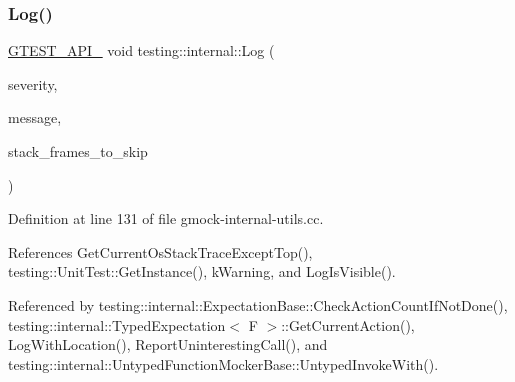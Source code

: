 \subsubsection{\texorpdfstring{Log()}{Log()}}
{\footnotesize\ttfamily \hyperlink{gtest-port_8h_aa73be6f0ba4a7456180a94904ce17790}{G\+T\+E\+S\+T\+\_\+\+A\+P\+I\+\_\+} void testing\+::internal\+::\+Log (\begin{DoxyParamCaption}\item[{\hyperlink{namespacetesting_1_1internal_a203d1a8a2147a53d12bbdae40d443914}{Log\+Severity}}]{severity,  }\item[{const \hyperlink{namespacetesting_1_1internal_a8e8ff5b11e64078831112677156cb111}{string} \&}]{message,  }\item[{int}]{stack\+\_\+frames\+\_\+to\+\_\+skip }\end{DoxyParamCaption})}



Definition at line 131 of file gmock-\/internal-\/utils.\+cc.



References Get\+Current\+Os\+Stack\+Trace\+Except\+Top(), testing\+::\+Unit\+Test\+::\+Get\+Instance(), k\+Warning, and Log\+Is\+Visible().



Referenced by testing\+::internal\+::\+Expectation\+Base\+::\+Check\+Action\+Count\+If\+Not\+Done(), testing\+::internal\+::\+Typed\+Expectation$<$ F $>$\+::\+Get\+Current\+Action(), Log\+With\+Location(), Report\+Uninteresting\+Call(), and testing\+::internal\+::\+Untyped\+Function\+Mocker\+Base\+::\+Untyped\+Invoke\+With().


